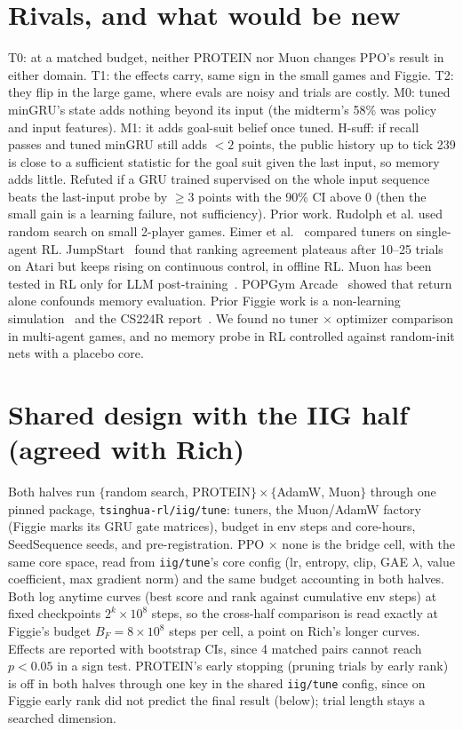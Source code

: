 \documentclass[10pt]{article}
\newcommand{\file}[1]{{\small\texttt{#1}}}
\begin{document}
\section{Rivals, and what would be new}
T0: at a matched budget, neither PROTEIN nor Muon changes PPO's result in either domain. T1: the effects carry, same sign in the small games and Figgie. T2: they flip in the large game, where evals are noisy and trials are costly. M0: tuned minGRU's state adds nothing beyond its input (the midterm's 58\% was policy and input features). M1: it adds goal-suit belief once tuned. H-suff: if recall passes and tuned minGRU still adds $<2$ points, the public history up to tick 239 is close to a sufficient statistic for the goal suit given the last input, so memory adds little. Refuted if a GRU trained supervised on the whole input sequence beats the last-input probe by $\geq$3 points with the 90\% CI above 0 (then the small gain is a learning failure, not sufficiency).
Prior work. Rudolph et al. used random search on small 2-player games. Eimer et al.~\cite{eimer} compared tuners on single-agent RL. JumpStart~\cite{jumpstart} found that ranking agreement plateaus after 10--25 trials on Atari but keeps rising on continuous control, in offline RL. Muon has been tested in RL only for LLM post-training~\cite{pion,muonagentic}. POPGym Arcade~\cite{popgym} showed that return alone confounds memory evaluation. Prior Figgie work is a non-learning simulation~\cite{disilvio} and the CS224R report~\cite{cs224r}. We found no tuner $\times$ optimizer comparison in multi-agent games, and no memory probe in RL controlled against random-init nets with a placebo core.

\section{Shared design with the IIG half (agreed with Rich)}
Both halves run $\{$random search, PROTEIN$\}\times\{$AdamW, Muon$\}$ through one pinned package, \file{tsinghua-rl/iig/tune}: tuners, the Muon/AdamW factory (Figgie marks its GRU gate matrices), budget in env steps and core-hours, SeedSequence seeds, and pre-registration. PPO $\times$ none is the bridge cell, with the same core space, read from \file{iig/tune}'s core config (lr, entropy, clip, GAE $\lambda$, value coefficient, max gradient norm) and the same budget accounting in both halves. Both log anytime curves (best score and rank against cumulative env steps) at fixed checkpoints $2^k\times10^8$ steps, so the cross-half comparison is read exactly at Figgie's budget $B_F=8\times10^8$ steps per cell, a point on Rich's longer curves. Effects are reported with bootstrap CIs, since 4 matched pairs cannot reach $p<0.05$ in a sign test. PROTEIN's early stopping (pruning trials by early rank) is off in both halves through one key in the shared \file{iig/tune} config, since on Figgie early rank did not predict the final result (below); trial length stays a searched dimension.
\end{document}

